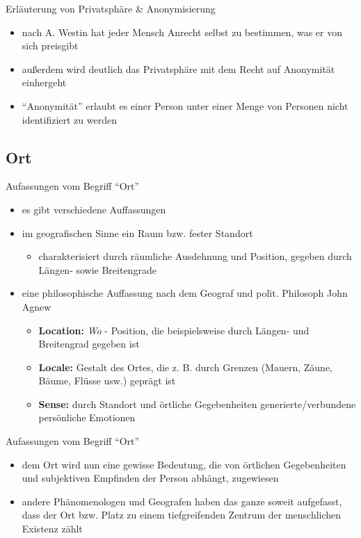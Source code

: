 \begin{frame}{Erläuterung von Privatsphäre \& Anonymisierung}
\begin{itemize}
  \item nach A. Westin hat jeder Mensch Anrecht selbst zu bestimmen, was er von sich preisgibt
  \item außerdem wird deutlich das Privatsphäre mit dem Recht auf Anonymität einhergeht
  \item "`Anonymität"' erlaubt es einer Person unter einer Menge von Personen nicht identifiziert zu werden
\end{itemize}
\end{frame}

\subsection*{Ort}
\begin{frame}{Aufassungen vom Begriff "`Ort"'}
\begin{itemize}
  \item es gibt verschiedene Auffassungen
  \item im geografischen Sinne ein Raum bzw. fester Standort
  \begin{itemize}
    \item charakterisiert durch räumliche Ausdehnung und Position, gegeben durch Längen- sowie Breitengrade
  \end{itemize}
  \item eine philosophische Auffassung nach dem Geograf und polit. Philosoph John Agnew
  \begin{itemize}
    \item \textbf{Location:} \textit{Wo} - Position, die beispielsweise durch Längen- und Breitengrad gegeben ist
    \item \textbf{Locale:} Gestalt des Ortes, die z. B. durch Grenzen (Mauern, Zäune, Bäume, Flüsse usw.) geprägt ist
    \item \textbf{Sense:} durch Standort und örtliche Gegebenheiten generierte/verbundene persönliche Emotionen
  \end{itemize}
\end{itemize}
\end{frame}

\begin{frame}{Aufassungen vom Begriff "`Ort"'}
\begin{itemize}
  \item dem Ort wird nun eine gewisse Bedeutung, die von örtlichen Gegebenheiten und subjektiven Empfinden der Person abhängt, zugewiesen
  \item andere Phänomenologen und Geografen haben das ganze soweit aufgefasst, dass der Ort bzw. Platz zu einem tiefgreifenden Zentrum der menschlichen Existenz zählt
\end{itemize}
\end{frame}


